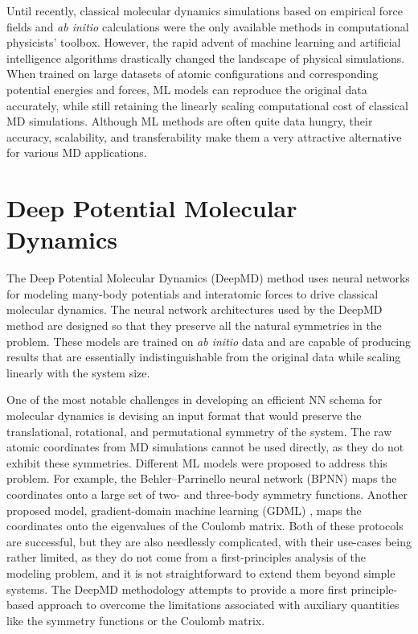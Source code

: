 Until recently, classical molecular dynamics simulations based on empirical
force fields and \textit{ab initio} calculations were the only available
methods in computational physicists' toolbox. However, the rapid advent of
machine learning and artificial intelligence algorithms drastically changed
the landscape of physical simulations. When trained on large datasets of
atomic configurations and corresponding potential energies and forces,
ML models can reproduce the original data accurately, while still retaining
the linearly scaling computational cost of classical MD simulations. Although
ML methods are often quite data hungry, their accuracy, scalability, and
transferability make them a very attractive alternative for various MD
applications.

\section{Deep Potential Molecular Dynamics}

The Deep Potential Molecular Dynamics (DeepMD) \parencite{Zhang_2018} method
uses neural networks for modeling many-body potentials and interatomic forces
to drive classical molecular dynamics. The neural network architectures used
by the DeepMD method are designed so that they preserve all the natural
symmetries in the problem. These models are trained on \textit{ab initio} data
and are capable of producing results that are essentially indistinguishable
from the original data while scaling linearly with the system size.

One of the most notable challenges in developing an efficient NN schema for
molecular dynamics is devising an input format that would preserve the
translational, rotational, and permutational symmetry of the system. The raw
atomic coordinates from MD simulations cannot be used directly, as they do not
exhibit these symmetries. Different ML models were proposed to address this
problem. For example, the Behler--Parrinello neural network (BPNN)
\parencite{PhysRevLett.98.146401} maps the coordinates onto a large set of
two- and three-body symmetry functions. Another proposed model,
gradient-domain machine learning (GDML)
\parencite{doi:10.1126/sciadv.1603015}, maps the coordinates onto the
eigenvalues of the Coulomb matrix. Both of these protocols are successful, but
they are also needlessly complicated, with their use-cases being rather
limited, as they do not come from a first-principles analysis of the modeling
problem, and it is not straightforward to extend them beyond simple systems.
The DeepMD methodology attempts to provide a more first principle-based
approach to overcome the limitations associated with auxiliary quantities like
the symmetry functions or the Coulomb matrix.

